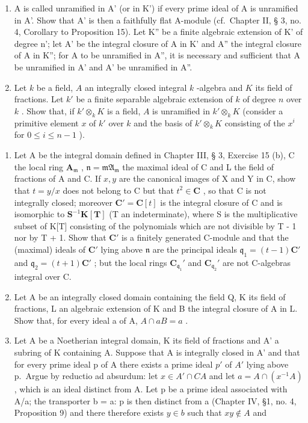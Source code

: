 \begin{enumerate}
\def\labelenumi{(\alph{enumi})}
\setcounter{enumi}{2}
\item
  A is called unramified in A' (or in K') if every prime ideal of A is unramified in A'. Show that A' is then a faithfully flat A-module (cf.~Chapter II, § 3, no. 4, Corollary to Proposition 15). Let K'' be a finite algebraic extension of K' of degree n'; let A' be the integral closure of A in K' and A'' the integral closure of A in K''; for A to be unramified in A'', it is necessary and sufficient that A be unramified in A' and A' be unramified in A''.
\item
  Let \(k\) be a field, \(A\) an integrally closed integral \(k\) -algebra and \(K\) its field of fractions. Let \(k'\) be a finite separable algebraic extension of \(k\) of degree \(n\) over \(k\) . Show that, if \(k' \otimes_k K\) is a field, \(A\) is unramified in \(k' \otimes_k K\) (consider a primitive element \(x\) of \(k'\) over \(k\) and the basis of \(k' \otimes_k K\) consisting of the \(x^i\) for \(0 \leqslant i \leqslant n - 1\) ).
\end{enumerate}

\begin{enumerate}
\def\labelenumi{\arabic{enumi}.}
\setcounter{enumi}{19}
\item
  Let A be the integral domain defined in Chapter III, § 3, Exercise 15 (b), C the local ring \(\mathbf{A}_{\mathfrak{m}}\) , \(\mathfrak{n} = \mathfrak{mA}_{\mathfrak{m}}\) the maximal ideal of C and L the field of fractions of A and C. If \(x, y\) are the canonical images of X and Y in C, show that \(t = y / x\) does not belong to C but that \(t^2 \in \mathbf{C}\) , so that C is not integrally closed; moreover \(\mathbf{C}' = \mathbf{C}[t]\) is the integral closure of C and is isomorphic to \(\mathbf{S}^{-1}\mathbf{K}[\mathbf{T}]\) (T an indeterminate), where S is the multiplicative subset of K{[}T{]} consisting of the polynomials which are not divisible by T - 1 nor by T + 1. Show that \(\mathbf{C}'\) is a finitely generated C-module and that the (maximal) ideals of \(\mathbf{C}'\) lying above \(\mathfrak{n}\) are the principal ideals \(\mathfrak{q}_1 = (t - 1)\mathbf{C}'\) and \(\mathfrak{q}_2 = (t + 1)\mathbf{C}'\) ; but the local rings \(\mathbf{C}_{\mathfrak{q}_1}'\) and \(\mathbf{C}_{\mathfrak{q}_2}'\) are not C-algebras integral over C.
\item
  Let A be an integrally closed domain containing the field Q, K its field of fractions, L an algebraic extension of K and B the integral closure of A in L. Show that, for every ideal a of A, \(A \cap aB = a\) .
\item
  Let A be a Noetherian integral domain, K its field of fractions and A' a subring of K containing A. Suppose that A is integrally closed in A' and that for every prime ideal p of A there exists a prime ideal \(p'\) of \(A'\) lying above p.~Argue by reductio ad absurdum: let \(x \in A' \cap C A\) and let \(a = A \cap (x^{-1} A)\) , which is an ideal distinct from A. Let p be a prime ideal associated with A/a; the transporter b = a: p is then distinct from a (Chapter IV, §1, no. 4, Proposition 9) and there therefore exists \(y \in b\) such that \(xy \notin A\) and
\end{enumerate}

